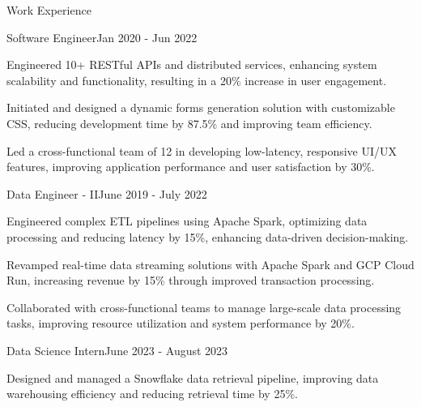 \documentclass{resume} %
\begin{document}
    \begin{rSection}{Work Experience}
                    \begin{rSubsection}
                {Software Engineer}{Jan 2020 - Jun 2022}
                                    {}
                                {}
                                    \item Engineered 10+ RESTful APIs and distributed services, enhancing system scalability and functionality, resulting in a 20\% increase in user engagement.
                                    \item Initiated and designed a dynamic forms generation solution with customizable CSS, reducing development time by 87.5\% and improving team efficiency.
                                    \item Led a cross{-}functional team of 12 in developing low{-}latency, responsive UI/UX features, improving application performance and user satisfaction by 30\%.
                            \end{rSubsection}
                    \begin{rSubsection}
                {Data Engineer {-} II}{June 2019 - July 2022}
                                    {}
                                {}
                                    \item Engineered complex ETL pipelines using Apache Spark, optimizing data processing and reducing latency by 15\%, enhancing data{-}driven decision{-}making.
                                    \item Revamped real{-}time data streaming solutions with Apache Spark and GCP Cloud Run, increasing revenue by 15\% through improved transaction processing.
                                    \item Collaborated with cross{-}functional teams to manage large{-}scale data processing tasks, improving resource utilization and system performance by 20\%.
                            \end{rSubsection}
                    \begin{rSubsection}
                {Data Science Intern}{June 2023 - August 2023}
                                    {}
                                {}
                                    \item Designed and managed a Snowflake data retrieval pipeline, improving data warehousing efficiency and reducing retrieval time by 25\%.

\end{rSubsection}
\end{rSection}
\end{document}
